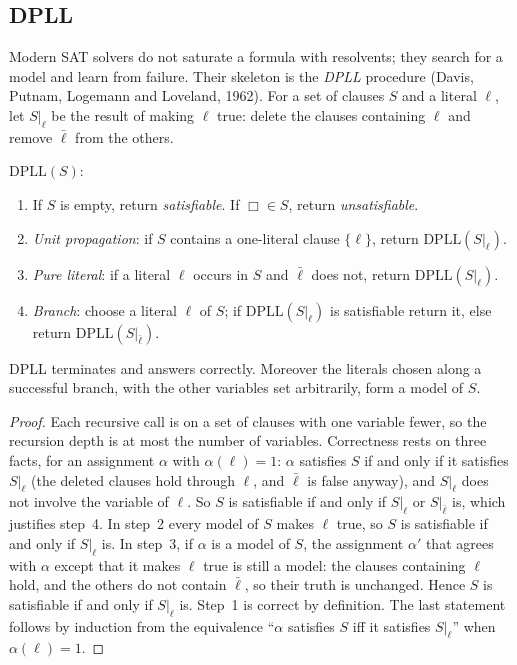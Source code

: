 \subsection*{DPLL}

Modern SAT solvers do not saturate a formula with resolvents; they search for a model and learn from failure. Their
skeleton is the \emph{DPLL} procedure (Davis, Putnam, Logemann and Loveland, 1962). For a set of clauses $S$ and a literal $\ell$,
let $S|_\ell$ be the result of making $\ell$ true: delete the clauses containing $\ell$ and remove $\bar\ell$ from the others.

\begin{center}
\begin{minipage}{0.9\linewidth}
$\mathrm{DPLL}(S)$:
\begin{enumerate}
\item If $S$ is empty, return \emph{satisfiable}. If $\Box\in S$, return \emph{unsatisfiable}.
\item \emph{Unit propagation}: if $S$ contains a one-literal clause $\{\ell\}$, return $\mathrm{DPLL}(S|_\ell)$.
\item \emph{Pure literal}: if a literal $\ell$ occurs in $S$ and $\bar\ell$ does not, return $\mathrm{DPLL}(S|_\ell)$.
\item \emph{Branch}: choose a literal $\ell$ of $S$; if $\mathrm{DPLL}(S|_\ell)$ is satisfiable return it, else return $\mathrm{DPLL}(S|_{\bar\ell})$.
\end{enumerate}
\end{minipage}
\end{center}

\begin{proposition}\label{prop:dpll}
DPLL terminates and answers correctly. Moreover the literals chosen along a successful branch, with the other variables
set arbitrarily, form a model of $S$.
\end{proposition}
\begin{proof}
Each recursive call is on a set of clauses with one variable fewer, so the recursion depth is at most the number of
variables. Correctness rests on three facts, for an assignment $\alpha$ with $\alpha(\ell)=1$: $\alpha$ satisfies $S$ if and only if it
satisfies $S|_\ell$ (the deleted clauses hold through $\ell$, and $\bar\ell$ is false anyway), and $S|_\ell$ does not involve the variable of $\ell$.
So $S$ is satisfiable if and only if $S|_\ell$ or $S|_{\bar\ell}$ is, which justifies step~4. In step~2 every model of $S$ makes $\ell$ true, so $S$ is
satisfiable if and only if $S|_\ell$ is. In step~3, if $\alpha$ is a model of $S$, the assignment $\alpha'$ that agrees with $\alpha$ except that it makes $\ell$
true is still a model: the clauses containing $\ell$ hold, and the others do not contain $\bar\ell$, so their truth is unchanged.
Hence $S$ is satisfiable if and only if $S|_\ell$ is. Step~1 is correct by definition. The last statement follows by
induction from the equivalence ``$\alpha$ satisfies $S$ iff it satisfies $S|_\ell$'' when $\alpha(\ell)=1$.
\end{proof}

